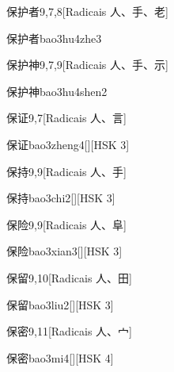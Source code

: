 \begin{entry}{保护者}{9,7,8}[Radicais ⼈、⼿、⽼]
  \begin{phonetics}{保护者}{bao3hu4zhe3}
  \end{phonetics}
\end{entry}

\begin{entry}{保护神}{9,7,9}[Radicais ⼈、⼿、⽰]
  \begin{phonetics}{保护神}{bao3hu4shen2}
  \end{phonetics}
\end{entry}

\begin{entry}{保证}{9,7}[Radicais ⼈、⾔]
  \begin{phonetics}{保证}{bao3zheng4}[][HSK 3]
  \end{phonetics}
\end{entry}

\begin{entry}{保持}{9,9}[Radicais ⼈、⼿]
  \begin{phonetics}{保持}{bao3chi2}[][HSK 3]
  \end{phonetics}
\end{entry}

\begin{entry}{保险}{9,9}[Radicais ⼈、⾩]
  \begin{phonetics}{保险}{bao3xian3}[][HSK 3]
  \end{phonetics}
\end{entry}

\begin{entry}{保留}{9,10}[Radicais ⼈、⽥]
  \begin{phonetics}{保留}{bao3liu2}[][HSK 3]
  \end{phonetics}
\end{entry}

\begin{entry}{保密}{9,11}[Radicais ⼈、⼧]
  \begin{phonetics}{保密}{bao3mi4}[][HSK 4]
  \end{phonetics}
\end{entry}

